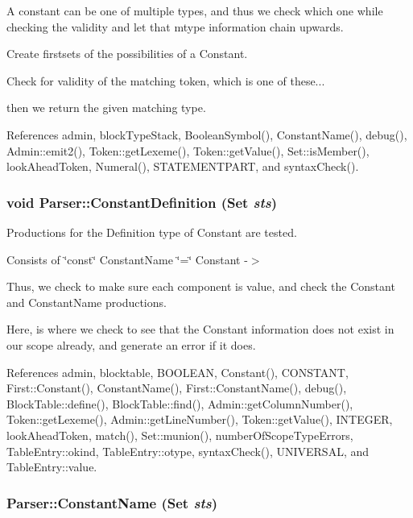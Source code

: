 A constant can be one of multiple types, and thus we check which one while checking the validity and let that mtype information chain upwards. 

Create firstsets of the possibilities of a Constant.

Check for validity of the matching token, which is one of these...

then we return the given matching type. 



References admin, blockTypeStack, BooleanSymbol(), ConstantName(), debug(), Admin::emit2(), Token::getLexeme(), Token::getValue(), Set::isMember(), lookAheadToken, Numeral(), STATEMENTPART, and syntaxCheck().

\hypertarget{classParser_abb393c5891c5a48e7be396bb6249ee4b}{
\subsubsection[{ConstantDefinition}]{\setlength{\rightskip}{0pt plus 5cm}void Parser::ConstantDefinition ({\bf Set} {\em sts})}}
\label{classParser_abb393c5891c5a48e7be396bb6249ee4b}


Productions for the Definition type of Constant are tested. 

Consists of \char`\"{}const\char`\"{} ConstantName \char`\"{}=\char`\"{} Constant -\/$>$

Thus, we check to make sure each component is value, and check the Constant and ConstantName productions.

Here, is where we check to see that the Constant information does not exist in our scope already, and generate an error if it does. 

References admin, blocktable, BOOLEAN, Constant(), CONSTANT, First::Constant(), ConstantName(), First::ConstantName(), debug(), BlockTable::define(), BlockTable::find(), Admin::getColumnNumber(), Token::getLexeme(), Admin::getLineNumber(), Token::getValue(), INTEGER, lookAheadToken, match(), Set::munion(), numberOfScopeTypeErrors, TableEntry::okind, TableEntry::otype, syntaxCheck(), UNIVERSAL, and TableEntry::value.

\hypertarget{classParser_abac5f93f9f59866cb683a5414cee14ac}{
\subsubsection[{ConstantName}]{ Parser::ConstantName ({\bf Set} {\em sts})}}
\label{classParser_abac5f93f9f59866cb683a5414cee14ac}


